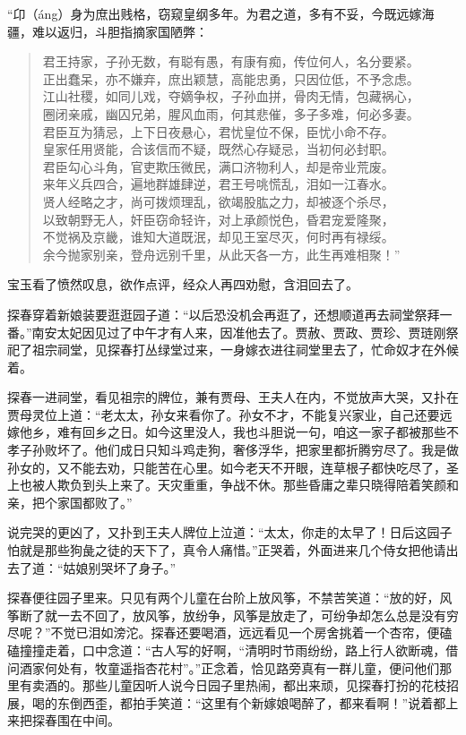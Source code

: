 \documentclass[12pt,oneside]{book}
\newenvironment{shici}{%
\begin{verse}%
\centering\large\hspace{12pt}}%
{\end{verse}}
\begin{document}
“卬（áng）身为庶出贱格，窃窥皇纲多年。为君之道，多有不妥，今既远嫁海疆，难以返归，斗胆指摘家国陋弊：

\begin{shici}
君王持家，子孙无数，有聪有愚，有康有痴，传位何人，名分要紧。\\
正出蠢呆，亦不嫌弃，庶出颖慧，高能忠勇，只因位低，不予念虑。\\
江山社稷，如同儿戏，夺嫡争权，子孙血拼，骨肉无情，包藏祸心，\\
圈闭亲戚，幽囚兄弟，腥风血雨，何其悲催，多子多难，何必多妻。\\
君臣互为猜忌，上下日夜悬心，君忧皇位不保，臣忧小命不存。\\
皇家任用贤能，合该信而不疑，既然心存疑忌，当初何必封职。\\
君臣勾心斗角，官吏欺压微民，满口济物利人，却是帝业荒废。\\
来年义兵四合，遍地群雄肆逆，君王号咷慌乱，泪如一江春水。\\
贤人经略之才，尚可拨烦理乱，欲竭股肱之力，却被逐个杀尽，\\
以致朝野无人，奸臣窃命轻许，对上承颜悦色，昏君宠爱隆聚，\\
不觉祸及京畿，谁知大道既泯，却见王室尽灭，何时再有禄绥。\\
余今抛家别亲，登舟远别千里，从此天各一方，此生再难相聚！”
\end{shici}


宝玉看了愤然叹息，欲作点评，经众人再四劝慰，含泪回去了。

探春穿着新娘装要逛逛园子道：“以后恐没机会再逛了，还想顺道再去祠堂祭拜一番。”南安太妃因见过了中午才有人来，因准他去了。贾赦、贾政、贾珍、贾琏刚祭祀了祖宗祠堂，见探春打丛绿堂过来，一身嫁衣进往祠堂里去了，忙命奴才在外候着。

探春一进祠堂，看见祖宗的牌位，兼有贾母、王夫人在内，不觉放声大哭，又扑在贾母灵位上道：“老太太，孙女来看你了。孙女不才，不能复兴家业，自己还要远嫁他乡，难有回乡之日。如今这里没人，我也斗胆说一句，咱这一家子都被那些不孝子孙败坏了。他们成日只知斗鸡走狗，奢侈浮华，把家里都折腾穷尽了。我是做孙女的，又不能去劝，只能苦在心里。如今老天不开眼，连草根子都快吃尽了，圣上也被人欺负到头上来了。天灾重重，争战不休。那些昏庸之辈只晓得陪着笑颜和亲，把个家国都败了。”

说完哭的更凶了，又扑到王夫人牌位上泣道：“太太，你走的太早了！日后这园子怕就是那些狗彘之徒的天下了，真令人痛惜。”正哭着，外面进来几个侍女把他请出去了道：“姑娘别哭坏了身子。”

探春便往园子里来。只见有两个儿童在台阶上放风筝，不禁苦笑道：“放的好，风筝断了就一去不回了，放风筝，放纷争，风筝是放走了，可纷争却怎么总是没有穷尽呢？”不觉已泪如滂沱。探春还要喝酒，远远看见一个房舍挑着一个杏帘，便磕磕撞撞走着，口中念道：“古人写的好啊，“清明时节雨纷纷，路上行人欲断魂，借问酒家何处有，牧童遥指杏花村”。”正念着，恰见路旁真有一群儿童，便问他们那里有卖酒的。那些儿童因听人说今日园子里热闹，都出来顽，见探春打扮的花枝招展，喝的东倒西歪，都拍手笑道：“这里有个新嫁娘喝醉了，都来看啊！”说着都上来把探春围在中间。
\end{document}
